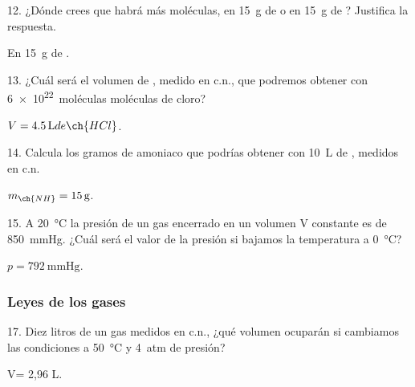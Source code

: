 \documentclass[11pt]{article}
\begin{document}
\begin{multicols}{2}
\begin{exercise}
  12. ¿Dónde crees que habrá más moléculas, en \SI{15}{g} de  o en
  \SI{15}{g} de ? Justifica la respuesta.
\end{exercise}
\begin{solution}
  En \SI{15}{g} de .
\end{solution}

\begin{exercise}
  13. ¿Cuál será el volumen de , medido en c.n., que podremos
  obtener con \SI{6e22}{moléculas} moléculas de cloro?
\end{exercise}
\begin{solution}
  $V = \SI{4.5}{\liter} de \ch{HCl}$.
\end{solution}

\begin{exercise}
  14. Calcula los gramos de amoniaco que podrías obtener con \SI{10}{\liter}
  de , medidos en c.n.
\end{exercise}
\begin{solution}
  $m_{\ch{NH}} = \SI{15}{g}$.
\end{solution}

\begin{exercise}
  15. A \SI{20}{\celsius} la presión de un gas encerrado en un volumen V constante es de \SI{850}{\mmHg}. ¿Cuál será el valor de la presión si bajamos la temperatura a \SI{0}{\celsius}?
\end{exercise}
\begin{solution}
  $p = \SI{792}{\mmHg}$.
\end{solution}



\subsubsection{Leyes de los gases}

\begin{exercise}
  17. Diez litros de un gas medidos en c.n., ¿qué volumen ocuparán
  si cambiamos las condiciones a \SI{50}{\celsius} y \SI{4}{atm} de presión?
\end{exercise}
\begin{solution}
  V= 2,96 L.
\end{solution}


\end{multicols}
\end{document}
